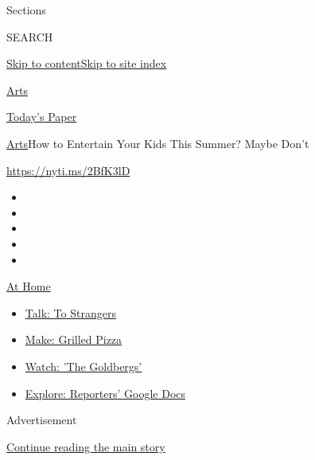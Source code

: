Sections

SEARCH

\protect\hyperlink{site-content}{Skip to
content}\protect\hyperlink{site-index}{Skip to site index}

\href{https://www.nytimes.com/section/arts}{Arts}

\href{https://myaccount.nytimes.com/auth/login?response_type=cookie\&client_id=vi}{}

\href{https://www.nytimes.com/section/todayspaper}{Today's Paper}

\href{/section/arts}{Arts}\textbar{}How to Entertain Your Kids This
Summer? Maybe Don't

\url{https://nyti.ms/2BfK3lD}

\begin{itemize}
\item
\item
\item
\item
\item
\end{itemize}

\href{https://www.nytimes.com/spotlight/at-home?action=click\&pgtype=Article\&state=default\&region=TOP_BANNER\&context=at_home_menu}{At
Home}

\begin{itemize}
\tightlist
\item
  \href{https://www.nytimes.com/2020/08/03/well/family/the-benefits-of-talking-to-strangers.html?action=click\&pgtype=Article\&state=default\&region=TOP_BANNER\&context=at_home_menu}{Talk:
  To Strangers}
\item
  \href{https://www.nytimes.com/2020/08/01/at-home/coronavirus-make-pizza-on-a-grill.html?action=click\&pgtype=Article\&state=default\&region=TOP_BANNER\&context=at_home_menu}{Make:
  Grilled Pizza}
\item
  \href{https://www.nytimes.com/2020/07/31/arts/television/goldbergs-abc-stream.html?action=click\&pgtype=Article\&state=default\&region=TOP_BANNER\&context=at_home_menu}{Watch:
  'The Goldbergs'}
\item
  \href{https://www.nytimes.com/interactive/2020/at-home/even-more-reporters-editors-diaries-lists-recommendations.html?action=click\&pgtype=Article\&state=default\&region=TOP_BANNER\&context=at_home_menu}{Explore:
  Reporters' Google Docs}
\end{itemize}

Advertisement

\protect\hyperlink{after-top}{Continue reading the main story}

